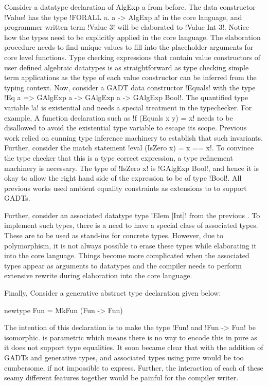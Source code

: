 \documentclass[manuscript,screen,nonacm]{acmart}
\begin{document}
Consider a datatype declaration of AlgExp a from before. The data constructor !Value! has the type !FORALL a. a -> AlgExp a! in the core language, and programmer written term !Value 3! will be elaborated to !Value Int 3!. Notice how the types need to be explicitly applied in the core language. The elaboration procedure needs to find unique values to fill into the placeholder arguments for core level functions. Type checking expressions that contain value constructors of user defined algebraic datatypes is as straightforward as type checking simple term applications as the type of each value constructor can be inferred from the typing context. Now, consider a GADT data constructor !Equals! with the type !Eq a => GAlgExp a -> GAlgExp a -> GAlgExp Bool!. The quantified type variable !a! is existential and needs a special treatment in the typechecker. For example, A function declaration such as !f (Equals x y) = x! needs to be disallowed to avoid the existential type variable to escape its scope. Previous work relied on cunning type inference machinery to establish that such invariants. Further, consider the match statement !eval (IsZero x) = x == x!. To convince the type checker that this is a type correct expression, a type refinement machinery is necessary. The type of !IsZero x! is !GAlgExp Bool!, and hence it is okay to allow the right hand side of the expression to be of type !Bool!. All previous works\cite{cheney_first-class_2003, xi_guarded_2003, peyton_jones_simple_2006} used ambient equality constraints as extensions to \SF to support GADTs.

Further, consider an associated datatype type !Elem [Int]! from the previous . To implement such types, there is a need to have a special class of associated types. These are to be used as stand-ins for concrete types. However, due to polymorphism, it is not always possible to erase these types while elaborating it into the core language. Things become more complicated when the associated types appear as arguments to datatypes and the compiler needs to perform extensive rewrite during elaboration into the core language.

Finally, Consider a generative abstract type declaration given below:

\begin{CenteredBox}
\begin{code}
newtype Fun = MkFun (Fun -> Fun)
\end{code}
\end{CenteredBox}
The intention of this declaration is to make the type !Fun! and !Fun -> Fun! be isomorphic. \SF is parametric which means there is no way to encode this in pure \SF as it does not support type equalities. It soon became clear that with the addition of GADTs and generative types, and associated types using pure \SF would be too cumbersome, if not impossible to express. Further, the interaction of each of these seamy different features together would be painful for the compiler writer.
\end{document}
